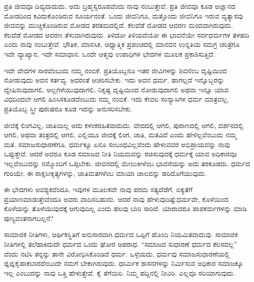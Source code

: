 \vspace{0.1cm}

ಪ್ರತಿ ಜೀವವೂ ದಿವ್ಯವಾದುದು. ಅದು ಬ್ರಹ್ಮಸ್ವರೂಪವೆಂದು ನಾವು ನಂಬುತ್ತೇವೆ. ಪ್ರತಿ ಜೀವವೂ ಕೂಡ ಅಜ್ಞಾನದ ಮೋಡದಿಂದ ಕವಿದುಕೊಂಡಿರುವ ಸೂರ್ಯನಂತೆ. ಒಂದು ಜೀವನಿಗೂ, ಮತ್ತೊಂದು ಜೀವನಿಗೂ ಇರುವ ವ್ಯತ್ಯಾಸವು ಜೀವವನ್ನು ಮುಚ್ಚಿಕೊಂಡಿರುವ ಮೋಡದ ತರತಮದಲ್ಲಿದೆ. ಕೆಲವೆಡೆ ಮೋಡದ ಆವರಣ ಮಂದವಾಗಿರುವುದು. ಕೆಲವೆಡೆ ಮೋಡದ ಆವರಣ ತೆಳುವಾಗಿರುವುದು. ತಿಳಿದೋ ತಿಳಿಯದೆಯೋ ಈ ಭಾವನೆಯೇ ಸರ್ವಧರ್ಮಗಳ ತಳಹದಿ ಎಂದು ನಾವು ನಂಬುತ್ತೇವೆ. ಭೌತಿಕ, ಮಾನಸಿಕ, ಆಧ್ಯಾತ್ಮಿಕ ಪ್ರಪಂಚದಲ್ಲಿ ಮಾನವನ ಉನ್ನತಿಯ ಸಮಗ್ರ ಚರಿತ್ರೆಗೂ ಇದೇ ವ್ಯಾಖ್ಯಾನ, ಇದೇ ಸಮಾಧಾನ. ಒಂದೇ ಆತ್ಮವು ಉಪಾಧಿಗಳ ಭೇದಗಳ ಮೂಲಕ ಪ್ರಕಾಶಿಸುತ್ತಿದೆ.

\vspace{0.2cm}

ಇದೇ ವೇದಗಳ ಸಾರವೆಂಬುದು ನಮ್ಮ ನಂಬಿಕೆ. ಪ್ರತಿಯೊಬ್ಬನೂ ಇತರ ಜೀವಿಗಳನ್ನು ಶಿವನೆಂಬ ದೃಷ್ಟಿಯಿಂದ ನೋಡುವುದು ಅವನ ಕರ್ತವ್ಯ. ಅದರಂತೆ ಆಚರಿಸಬೇಕು. ಇದು ಅವನ ಧರ್ಮ. ಹಾಗಲ್ಲದೆ ಇನ್ನೊಬ್ಬರನ್ನು ದ್ವೇಷಿಸುವುದಾಗಲಿ, ಅಲ್ಲಗಳೆಯುವುದಾಗಲಿ, ನಿಕೃಷ್ಟ ದೃಷ್ಟಿಯಿಂದ ನೋಡುವುದಾಗಲಿ ಅಥವಾ ಇನ್ನೂ ಯಾವ ವಿಧದಿಂದಲೇ ಆಗಲಿ ಹಿಂಸಿಸಕೂಡದೆಂಬುದು ನಮ್ಮ ನಂಬಿಕೆ. ಇದು ಕೇವಲ ಸಂನ್ಯಾಸಿಗಳ ಧರ್ಮ ಮಾತ್ರವಲ್ಲ, ಪ್ರತಿಯೊಬ್ಬ ಸ್ತ್ರೀ ಪುರುಷರೂ ಕೂಡ ಇದನ್ನು ಅನುಸರಿಸಬೇಕು.

\vspace{0.2cm}

ಜೀವಕ್ಕೆ ಲಿಂಗವಿಲ್ಲ, ಜಾತಿಯಿಲ್ಲ ಅದು ಕಳಂಕರಹಿತವಾದುದು. ವೇದದಲ್ಲಿ ಆಗಲಿ, ಪುರಾಣದಲ್ಲಿ ಆಗಲಿ, ದರ್ಶನದಲ್ಲಿ ಆಗಲಿ, ಅಥವಾ ತಂತ್ರದಲ್ಲಿ ಆಗಲಿ, ಎಲ್ಲಿಯೂ ಜೀವಕ್ಕೆ ಲಿಂಗ, ಜಾತಿ, ಮತವಿದೆ ಎಂದು ಹೇಳಿಲ್ಲವೆಂಬುದು ನಮ್ಮ ಮತ. ಸಮಾಜಸುಧಾರಣೆಗೂ, ಧರ್ಮಕ್ಕೂ ಏನೂ ಸಂಬಂಧವಿಲ್ಲವೆಂದು ಹೇಳುವವರ ಅಭಿಪ್ರಾಯವನ್ನು ನಾವು ಒಪ್ಪುತ್ತೇವೆ. ಆದರೆ ಅವರೂ ಕೂಡ ಸಮಾಜದ ನೀತಿ ನಿಯಮವನ್ನು ರಚಿಸುವುದಕ್ಕೆ ಧರ್ಮಕ್ಕೆ ಯಾವ ಅಧಿಕಾರವೂ ಇಲ್ಲವೆಂಬುದನ್ನು ನಮ್ಮೊಂದಿಗೆ ಒಪ್ಪಬೇಕು. ಜೀವನದಲ್ಲಿ ಮೇಲುಕೀಳೆಂಬ ಭಾವನೆಯನ್ನು ಅದು ತರಕೂಡದು. ಧರ್ಮದ ಗುರಿಯೇ, ಈ ರಾಕ್ಷಸೀಕೃತ್ಯಗಳನ್ನು, ಜಾತಿಮತಗಳೆಂಬ ಮಾಯಾ ಜಾಲವನ್ನು ಹರಿದೊಗೆಯುವುದು.

\vspace{0.2cm}

ಈ ಭೇದಗಳು ಆವಶ್ಯಕವೆಂದೂ, ಇವುಗಳ ಮೂಲಕವೇ ನಾವು ಪರಮ ಸತ್ಯದೆಡೆಗೆ, ಐಕ್ಯತೆಗೆ ಪ್ರಯಾಣಮಾಡುತ್ತೇವೆಂದೂ ಅವರು ವಾದಿಸಬಹುದು. ಆದರೆ ನಾವು ಹೇಳುವುದಿಷ್ಟೆ:ಧರ್ಮವೇ, ಕೊಳೆಯಿಂದ ಕೊಳೆಯನ್ನು ತೊಳೆಯುವುದಕ್ಕೆ ಆಗುವುದಿಲ್ಲ ಎಂದು ಹಲವು ಬಾರಿ ಸಾರಿದೆ. ಯಾರಾದರೂ ಪಾಪಕರ್ಮಗಳನ್ನು ಮಾಡಿ ಪುಣ್ಯವಂತನಾಗಬಲ್ಲನೆ?

\vspace{0.2cm}

ಸಾಮಾಜಿಕ ನೀತಿಗಳು, ಆರ್ಥಿಕಸ್ಥಿತಿಗೆ ಅನುಸಾರವಾಗಿ ಧರ್ಮದ ಒಪ್ಪಿಗೆ ಹೊಂದಿ ನಿಯಮಿತವಾದುವು. ಸಾಮಾಜಿಕ ನೀತಿಗಳಲ್ಲಿ ತಲೆಹಾಕಿದುದೇ ಧರ್ಮದ ಒಂದು ಘೋರ ಅಪರಾಧ. “ಸಮಾಜದ ಸುಧಾರಣೆ ಧರ್ಮದ ಕೆಲಸವಲ್ಲ” ವೆಂದು ನಟಿಸಿ ತನ್ನನ್ನು ತಾನೇ ವಿರೋಧಿಸಿಕೊಂಡಿದೆ ಧರ್ಮ. ಒಳ್ಳೆಯದು, ಧರ್ಮವು ಸಮಾಜಸುಧಾರಣೆಯಲ್ಲಿ ಜ್ಞಿಜ್ಞಿಕೈಹಾಕಬಾರದೆಂಬುದೇ ನಮಗೆ ಬೇಕಾಗಿರುವುದು. ಧಾರ್ಮಿಕ ಶಾಸನಗಳನ್ನು ನಿರ್ಮಿಸುವ ಅಧಿಕಾರ ಸಮಾಜಕ್ಕೂ ಇಲ್ಲ ಎಂಬುದನ್ನು ನಾವು ಒತ್ತಿ ಹೇಳುತ್ತೇವೆ. ಕೈ ತೆಗೆಯಿರಿ. ನಿಮ್ಮ ಹದ್ದಿನಲ್ಲಿ ನೀವಿರಿ. ಎಲ್ಲವೂ ಸರಿಯಾಗುವುದು.

